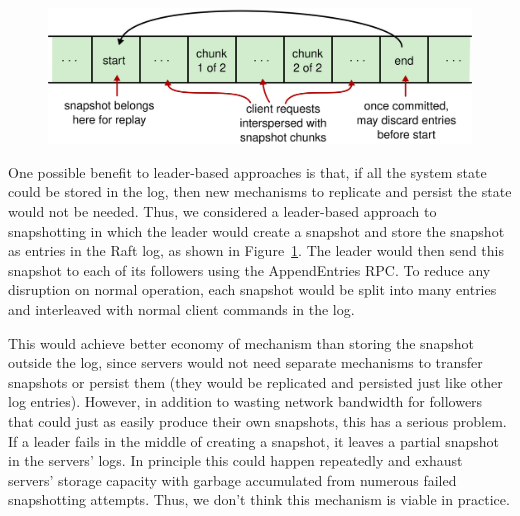 \begin{figure}
\centering
\includegraphics[scale=0.5]{compaction/logbased}
\label{fig:compaction:logbased}
\end{figure}

One possible benefit to leader-based approaches is that, if all the
system state could be stored in the log, then new mechanisms to
replicate and persist the state would not be needed. Thus, we considered
a leader-based approach to snapshotting in which the leader would create
a snapshot and store the snapshot as entries in the Raft log, as shown
in Figure~\ref{fig:compaction:logbased}. The leader would then send this
snapshot to each of its followers using the AppendEntries RPC. 
To reduce any disruption on normal operation, each snapshot would be
split into many entries and interleaved with normal client commands in
the log.

This would achieve better economy of mechanism than storing the snapshot
outside the log, since servers would not need separate mechanisms to
transfer snapshots or persist them (they would be replicated and persisted
just like other log entries). However, in addition to wasting network
bandwidth for followers that could just as easily produce their own
snapshots, this has a serious problem. If a leader fails in the middle
of creating a snapshot, it leaves a partial snapshot in the servers'
logs. In principle this could happen repeatedly and exhaust servers'
storage capacity with garbage accumulated from numerous failed
snapshotting attempts. Thus, we don't think this mechanism is viable in
practice.



